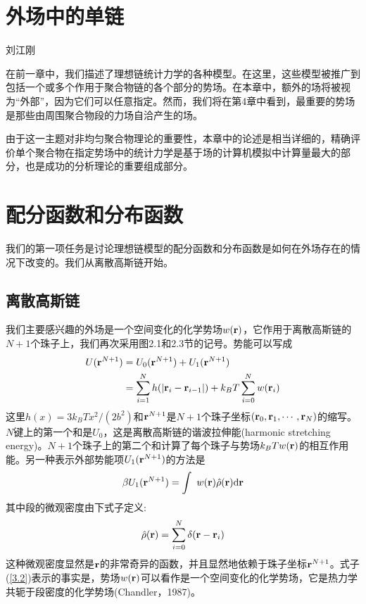 \section{外场中的单链}
{\color{red}\begin{center}
        刘江刚
    \end{center}}

在前一章中，我们描述了理想链统计力学的各种模型。在这里，这些模型被推广到包括一个或多个作用于聚合物链的各个部分的势场。在本章中，额外的场将被视为“外部”，因为它们可以任意指定。然而，我们将在第4章中看到，最重要的势场是那些由周围聚合物段的力场自洽产生的场。

由于这一主题对非均匀聚合物理论的重要性，本章中的论述是相当详细的，精确评价单个聚合物在指定势场中的统计力学是基于场的计算机模拟中计算量最大的部分，也是成功的分析理论的重要组成部分。

\section{配分函数和分布函数}
我们的第一项任务是讨论理想链模型的配分函数和分布函数是如何在外场存在的情况下改变的。我们从离散高斯链开始。
\subsection{离散高斯链}
我们主要感兴趣的外场是一个空间变化的化学势场$w(\mathbf{r})$，它作用于离散高斯链的$N+1$个珠子上，我们再次采用图2.1和2.3节的记号。势能可以写成
\begin{equation}\label{3.1}
\begin{aligned}
U(\mathbf{r}^{N+1})&=U_0(\mathbf{r}^{N+1})+U_1(\mathbf{r}^{N+1})\\
&=\sum\limits_{i=1}^Nh(\left|\mathbf{r}_i-\mathbf{r}_{i-1}\right|)+k_BT\sum\limits_{i=0}^Nw(\mathbf{r}_i)
\end{aligned}
\end{equation}
这里$h(x)=3k_BTx^2/(2b^2)$和$\mathbf{r}^{N+1}$是$N+1$个珠子坐标$(\mathbf{r}_0,\mathbf{r}_1,\cdots,\mathbf{r}_N)$的缩写。$N$键上的第一个和是$U_0$，这是离散高斯链的谐波拉伸能(harmonic stretching energy)。$N+1$个珠子上的第二个和计算了每个珠子与势场$k_BTw(\mathbf{r})$的相互作用能。另一种表示外部势能项$U_1(\mathbf{r}^{N+1})$的方法是
\begin{equation}\label{3.2}
\beta U_1(\mathbf{r}^{N+1})=\int~w(\mathbf{r})\hat{\rho}(\mathbf{r})\mathrm{d}\mathbf{r}
\end{equation}
其中段的微观密度由下式子定义:
\begin{equation}\label{3.3}
\hat{\rho}(\mathbf{r})=\sum\limits_{i=0}^N\delta(\mathbf{r}-\mathbf{r}_i)
\end{equation}
这种微观密度显然是$\mathbf{r}$的非常奇异的函数，并且显然地依赖于珠子坐标$\mathbf{r}^{N+1}$。式子(\ref{3.2})表示的事实是，势场$w(\mathbf{r})$可以看作是一个空间变化的化学势场，它是热力学共轭于段密度的化学势场(Chandler，1987)。

